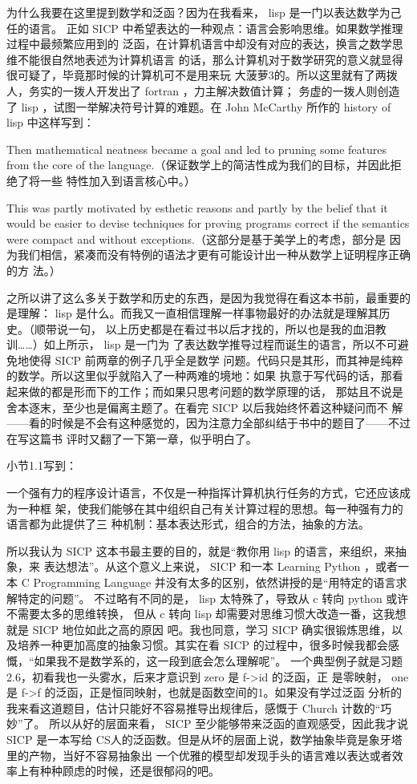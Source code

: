 \documentclass[11pt]{article}
\begin{document}
为什么我要在这里提到数学和泛函？因为在我看来， lisp 是一门以表达数学为己任的语言。
正如 SICP 中希望表达的一种观点：语言会影响思维。如果数学推理过程中最频繁应用到的
泛函，在计算机语言中却没有对应的表达，换言之数学思维不能很自然地表述为计算机语言
的话，那么计算机对于数学研究的意义就显得很可疑了，毕竟那时候的计算机可不是用来玩
大菠萝3的。所以这里就有了两拨人，务实的一拨人开发出了 fortran ，力主解决数值计算；
务虚的一拨人则创造了 lisp ，试图一举解决符号计算的难题。在 John McCarthy 所作的
history of lisp 中这样写到：

Then mathematical neatness became a goal and led to pruning some features from
the core of the language.（保证数学上的简洁性成为我们的目标，并因此拒绝了将一些
特性加入到语言核心中。）

This was partly motivated by esthetic reasons and partly by the belief that it
would be easier to devise techniques for proving programs correct if the
semantics were compact and without exceptions.（这部分是基于美学上的考虑，部分是
因为我们相信，紧凑而没有特例的语法才更有可能设计出一种从数学上证明程序正确的方
法。）

之所以讲了这么多关于数学和历史的东西，是因为我觉得在看这本书前，最重要的是理解：
lisp 是什么。而我又一直相信理解一样事物最好的办法就是理解其历史。（顺带说一句，
以上历史都是在看过书以后才找的，所以也是我的血泪教训……）如上所示， lisp 是一门为
了表达数学推导过程而诞生的语言，所以不可避免地使得 SICP 前两章的例子几乎全是数学
问题。代码只是其形，而其神是纯粹的数学。所以这里似乎就陷入了一种两难的境地：如果
执意于写代码的话，那看起来做的都是形而下的工作；而如果只思考问题的数学原理的话，
那姑且不说是舍本逐末，至少也是偏离主题了。在看完 SICP 以后我始终怀着这种疑问而不
解——看的时候是不会有这种感觉的，因为注意力全部纠结于书中的题目了——不过在写这篇书
评时又翻了一下第一章，似乎明白了。

小节1.1写到：

一个强有力的程序设计语言，不仅是一种指挥计算机执行任务的方式，它还应该成为一种框
架，使我们能够在其中组织自己有关计算过程的思想。每一种强有力的语言都为此提供了三
种机制：基本表达形式，组合的方法，抽象的方法。

所以我认为 SICP 这本书最主要的目的，就是“教你用 lisp 的语言，来组织，来抽象，来
表达想法”。从这个意义上来说， SICP 和一本 Learning Python ，或者一本 C
Programming Language 并没有太多的区别，依然讲授的是“用特定的语言求解特定的问题”。
不过略有不同的是， lisp 太特殊了，导致从 c 转向 python 或许不需要太多的思维转换，
但从 c 转向 lisp 却需要对思维习惯大改造一番，这我想就是 SICP 地位如此之高的原因
吧。我也同意，学习 SICP 确实很锻炼思维，以及培养一种更加高度的抽象习惯。其实在看
SICP 的过程中，很多时候我都会感慨，“如果我不是数学系的，这一段到底会怎么理解呢”。
一个典型例子就是习题2.6，初看我也一头雾水，后来才意识到 zero 是 f->id 的泛函，正
是零映射， one 是 f->f 的泛函，正是恒同映射，也就是函数空间的1。如果没有学过泛函
分析的我来看这道题目，估计只能好不容易推导出规律后，感慨于 Church 计数的“巧妙”了。
所以从好的层面来看， SICP 至少能够带来泛函的直观感受，因此我才说 SICP 是一本写给
CS人的泛函数。但是从坏的层面上说，数学抽象毕竟是象牙塔里的产物，当好不容易抽象出
一个优雅的模型却发现手头的语言难以表达或者效率上有种种顾虑的时候，还是很郁闷的吧。
\end{document}

